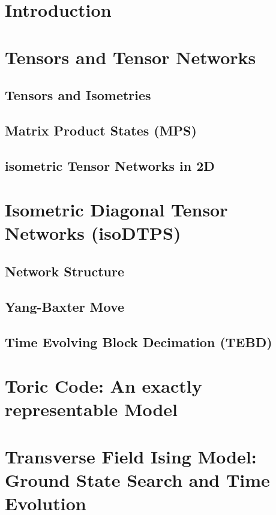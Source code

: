 \documentclass[encoding=utf8,british]{template/thesis}
\begin{document}
	\chapter{Introduction}
	
	\chapter{Tensors and Tensor Networks}
	
	\section{Tensors and Isometries}
	
	\section{Matrix Product States (MPS)}
	
	\section{isometric Tensor Networks in 2D}
	
	\chapter{Isometric Diagonal Tensor Networks (isoDTPS)}
		
	\section{Network Structure}
	
	\section{Yang-Baxter Move}
	
	\section{Time Evolving Block Decimation (TEBD)}
	
	\chapter{Toric Code: An exactly representable Model}
	
	\chapter{Transverse Field Ising Model: Ground State Search and Time Evolution}
	
\end{document}
